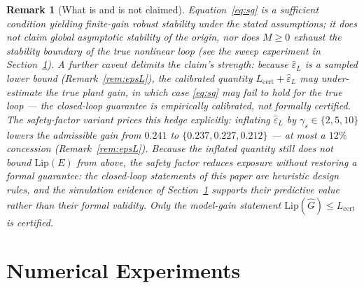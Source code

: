 \documentclass[11pt]{article}
\newtheorem{remark}{Remark}
\newcommand{\Ghat}{\hat{G}}
\newcommand{\Lhat}{L_{\mathrm{cert}}}
\newcommand{\epsL}{\varepsilon_L}
\begin{document}
\begin{remark}[What is and is not claimed]\label{rem:claim}
Equation~\eqref{eq:sg} is a \emph{sufficient} condition yielding
finite-gain robust stability under the stated assumptions; it does not claim
global asymptotic stability of the origin, nor does $M\ge0$ exhaust the
stability boundary of the true nonlinear loop (see the sweep experiment in
Section~\ref{sec:experiments}).
A further caveat delimits the claim's strength: because $\hat\epsL$ is a
sampled \emph{lower} bound (Remark~\ref{rem:epsL}), the calibrated
quantity $\Lhat+\hat\epsL$ may under-estimate the true plant gain, in
which case \eqref{eq:sg} may fail to hold for the true loop --- the
closed-loop guarantee is \emph{empirically calibrated}, not formally
certified. The safety-factor variant prices this hedge explicitly:
inflating $\hat\epsL$ by $\gamma_s\in\{2,5,10\}$ lowers the admissible
gain from $0.241$ to $\{0.237,0.227,0.212\}$ --- at most a $12\%$
concession (Remark~\ref{rem:epsL}). Because the inflated quantity still
does not bound $\mathrm{Lip}(E)$ from above, the safety factor reduces
exposure without restoring a formal guarantee: the closed-loop statements
of this paper are heuristic design rules, and the simulation evidence of
Section~\ref{sec:experiments} supports their \emph{predictive} value rather
than their formal validity. Only the model-gain statement
$\mathrm{Lip}(\Ghat)\le\Lhat$ is certified.
\end{remark}

\section{Numerical Experiments}\label{sec:experiments}
\end{document}
